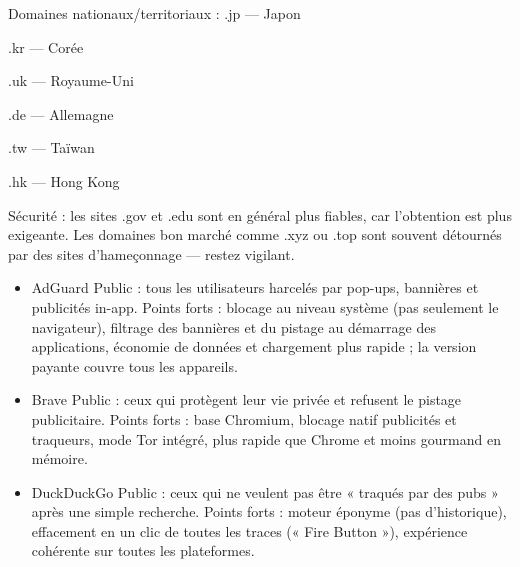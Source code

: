 Domaines nationaux/territoriaux : .jp — Japon

.kr — Corée

.uk — Royaume-Uni

.de — Allemagne

.tw — Taïwan

.hk — Hong Kong

Sécurité : les sites .gov et .edu sont en général plus fiables, car l'obtention est plus exigeante. Les domaines bon marché comme .xyz ou .top sont souvent détournés par des sites d'hameçonnage — restez vigilant.


\begin{itemize}
  \item AdGuard Public : tous les utilisateurs harcelés par pop-ups, bannières et publicités in-app. Points forts : blocage au niveau système (pas seulement le navigateur), filtrage des bannières et du pistage au démarrage des applications, économie de données et chargement plus rapide ; la version payante couvre tous les appareils.
\end{itemize}


\begin{itemize}
  \item Brave Public : ceux qui protègent leur vie privée et refusent le pistage publicitaire. Points forts : base Chromium, blocage natif publicités et traqueurs, mode Tor intégré, plus rapide que Chrome et moins gourmand en mémoire.
  \item DuckDuckGo Public : ceux qui ne veulent pas être « traqués par des pubs » après une simple recherche. Points forts : moteur éponyme (pas d'historique), effacement en un clic de toutes les traces (« Fire Button »), expérience cohérente sur toutes les plateformes.
\end{itemize}


